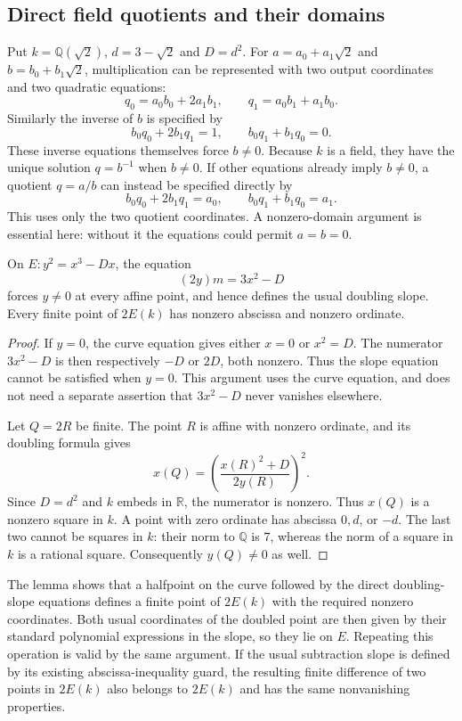 \subsection{Direct field quotients and their domains}
\label{subsec:direct-field-quotients}

Put $k=\mathbb Q(\sqrt2)$, $d=3-\sqrt2$ and $D=d^2$.
For $a=a_0+a_1\sqrt2$ and $b=b_0+b_1\sqrt2$, multiplication
can be represented with two output coordinates and two quadratic equations:
\[
 q_0=a_0b_0+2a_1b_1,\qquad q_1=a_0b_1+a_1b_0.
\]
Similarly the inverse of $b$ is specified by
\[
 b_0q_0+2b_1q_1=1,\qquad b_0q_1+b_1q_0=0.
\]
These inverse equations themselves force $b\ne0$.  Because $k$ is
a field, they have the unique solution $q=b^{-1}$ when $b\ne0$.
If other equations already imply $b\ne0$, a quotient $q=a/b$ can
instead be specified directly by
\[
 b_0q_0+2b_1q_1=a_0,\qquad
 b_0q_1+b_1q_0=a_1.
\]
This uses only the two quotient coordinates.  A nonzero-domain argument
is essential here: without it the equations could permit $a=b=0$.

\begin{lemma}\label{lem:doubling-quotient-domain}
On $E:y^2=x^3-Dx$, the equation
\[
                           (2y)m=3x^2-D
\]
forces $y\ne0$ at every affine point, and hence defines the usual
doubling slope.  Every finite point of $2E(k)$ has nonzero abscissa
and nonzero ordinate.
\end{lemma}
\begin{proof}
If $y=0$, the curve equation gives either $x=0$ or $x^2=D$.
The numerator $3x^2-D$ is then respectively $-D$ or $2D$,
both nonzero.  Thus the slope equation cannot be satisfied when
$y=0$.  This argument uses the curve equation, and does not need
a separate assertion that $3x^2-D$ never vanishes elsewhere.

Let $Q=2R$ be finite.  The point $R$ is affine with nonzero
ordinate, and its doubling formula gives
\[
                  x(Q)=\left(\frac{x(R)^2+D}{2y(R)}\right)^2.
\]
Since $D=d^2$ and $k$ embeds in $\mathbb R$, the numerator is
nonzero.  Thus $x(Q)$ is a nonzero square in $k$.  A point with
zero ordinate has abscissa $0,d$, or $-d$.  The last two cannot
be squares in $k$: their norm to $\mathbb Q$ is $7$, whereas
the norm of a square in $k$ is a rational square.  Consequently
$y(Q)\ne0$ as well.
\end{proof}

The lemma shows that a halfpoint on the curve followed by the direct
doubling-slope equations defines a finite point of $2E(k)$ with the
required nonzero coordinates.  Both usual coordinates of the doubled
point are then given by their standard polynomial expressions in the
slope, so they lie on $E$.  Repeating this operation is valid by the
same argument.  If the usual subtraction slope is defined by its
existing abscissa-inequality guard, the resulting finite difference
of two points in $2E(k)$ also belongs to $2E(k)$ and has the same
nonvanishing properties.

